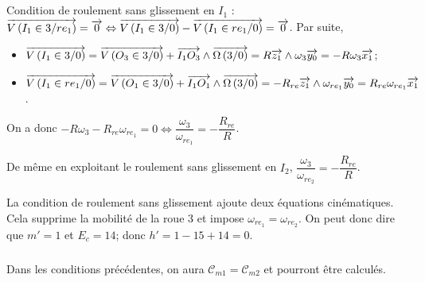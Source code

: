 \documentclass[10pt,fleqn]{article} %
\begin{document}
%

\subparagraph{}
Condition de roulement sans glissement en $I_1$ : $\overrightarrow{V\left( {I_1} \in {3}/{re_1}\right)} = \overrightarrow{0} \Leftrightarrow \overrightarrow{V\left( {I_1} \in {3}/{0}\right)}-\overrightarrow{V\left( {I_1} \in {re_1}/{0}\right)} = \overrightarrow{0}$. Par suite, 
\begin{itemize}
\item $\overrightarrow{V\left( {I_1} \in {3}/{0}\right)}=\overrightarrow{V\left( {O_3} \in {3}/{0}\right)}+\overrightarrow{I_1 O_3}\wedge \overrightarrow{\Omega\left( {3}/{0}\right)} = R\overrightarrow{z_1} \wedge \omega_3\overrightarrow{y_0}=-R\omega_3 \overrightarrow{x_1}$;
\item $\overrightarrow{V\left( {I_1} \in {re_1}/{0}\right)}=\overrightarrow{V\left( {O_1} \in {3}/{0}\right)}+\overrightarrow{I_1 O_1}\wedge \overrightarrow{\Omega\left( {3}/{0}\right)} = -R_{re}\overrightarrow{z_1} \wedge \omega_{re_1}\overrightarrow{y_0}=R_{re}\omega_{re_1} \overrightarrow{x_1}$.
\end{itemize}
On a donc $-R\omega_3 -R_{re}\omega_{re_1} =0 \Leftrightarrow\dfrac{\omega_3}{\omega_{re_1}}=-\dfrac{R_{re}}{R} $.

De même en exploitant le roulement sans glissement en $I_2$, $\dfrac{\omega_3}{\omega_{re_2}}=-\dfrac{R_{re}}{R} $. 

La condition de roulement sans glissement ajoute deux équations cinématiques. Cela supprime la mobilité de la roue 3 et impose $\omega_{re_1}=\omega_{re_2}$. 
On peut donc dire que $m'=1$ et $E_c=14$; donc $h'=1-15+14=0$. 

\subparagraph{}
Dans les conditions précédentes, on aura $\mathcal{C}_{m1}=\mathcal{C}_{m2}$ et pourront être calculés. 

\end{document}
